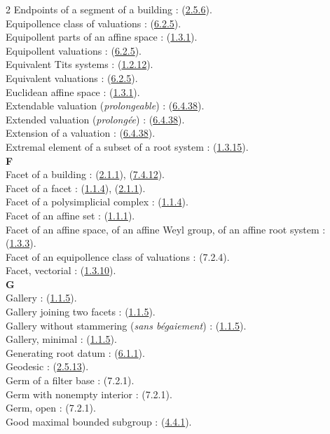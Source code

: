 \documentclass[12pt,a4paper,oneside,english]{smfart}
\newcommand{\btref}[1]{\hyperlink{bt:#1}{#1}}
\theoremstyle{definition}
\theoremstyle{bt}
\begin{document}
\begin{multicols}{2}
Endpoints of a segment of a building : (\btref{2.5.6}).\\
Equipollence class of valuations : (\btref{6.2.5}).\\
Equipollent parts of an affine space : (\btref{1.3.1}).\\
Equipollent valuations : (\btref{6.2.5}).\\
Equivalent Tits systems : (\btref{1.2.12}).\\
Equivalent valuations : (\btref{6.2.5}).\\
Euclidean affine space : (\btref{1.3.1}).\\
Extendable valuation (\emph{prolongeable}) : (\btref{6.4.38}).\\
Extended valuation (\emph{prolongée}) : (\btref{6.4.38}).\\
Extension of a valuation : (\btref{6.4.38}).\\
Extremal element of a subset of a root system : (\btref{1.3.15}).\\
\textbf{F}\\
Facet of a building : (\btref{2.1.1}), (\btref{7.4.12}).\\
Facet of a facet : (\btref{1.1.4}), (\btref{2.1.1}).\\
Facet of a polysimplicial complex : (\btref{1.1.4}).\\
Facet of an affine set : (\btref{1.1.1}).\\
Facet of an affine space, of an affine Weyl group, of an affine root system : (\btref{1.3.3}).\\
Facet of an equipollence class of valuations : (7.2.4).\\
Facet, vectorial : (\btref{1.3.10}).\\
\textbf{G}\\
Gallery : (\btref{1.1.5}).\\
Gallery joining two facets : (\btref{1.1.5}).\\
Gallery without stammering (\emph{sans bégaiement}) : (\btref{1.1.5}).\\
Gallery, minimal : (\btref{1.1.5}).\\
Generating root datum : (\btref{6.1.1}).\\
Geodesic : (\btref{2.5.13}).\\
Germ of a filter base : (7.2.1).\\
Germ with nonempty interior : (7.2.1).\\
Germ, open : (7.2.1).\\
Good maximal bounded subgroup : (\btref{4.4.1}).\\

\end{multicols}
\end{document}
